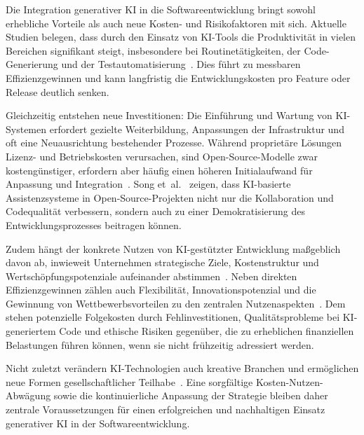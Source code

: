 
Die Integration generativer KI in die Softwareentwicklung bringt sowohl
erhebliche Vorteile als auch neue Kosten- und Risikofaktoren mit sich. Aktuelle
Studien belegen, dass durch den Einsatz von KI-Tools die Produktivität in
vielen Bereichen signifikant steigt, insbesondere bei Routinetätigkeiten, der
Code-Generierung und der Testautomatisierung~\cite{marguerit_augmenting_2025,
    farach_evolving_2025, habibi_open_2025}. Dies führt zu messbaren
Effizienzgewinnen und kann langfristig die Entwicklungskosten pro Feature oder
Release deutlich senken.

Gleichzeitig entstehen neue Investitionen: Die Einführung und Wartung von
KI-Systemen erfordert gezielte Weiterbildung, Anpassungen der Infrastruktur und
oft eine Neuausrichtung bestehender Prozesse. Während proprietäre Lösungen
Lizenz- und Betriebskosten verursachen, sind Open-Source-Modelle zwar
kostengünstiger, erfordern aber häufig einen höheren Initialaufwand für
Anpassung und Integration~\cite{habibi_open_2025}. Song
et~al.~\cite{song_impact_2024} zeigen, dass KI-basierte Assistenzsysteme in
Open-Source-Projekten nicht nur die Kollaboration und Codequalität verbessern,
sondern auch zu einer Demokratisierung des Entwicklungsprozesses beitragen
können.

Zudem hängt der konkrete Nutzen von KI-gestützter Entwicklung maßgeblich davon
ab, inwieweit Unternehmen strategische Ziele, Kostenstruktur und
Wertschöpfungspotenziale aufeinander
abstimmen~\cite{mcnamara_exponential_2025}. Neben direkten Effizienzgewinnen
zählen auch Flexibilität, Innovationspotenzial und die Gewinnung von
Wettbewerbsvorteilen zu den zentralen
Nutzenaspekten~\cite{storey_generative_2025}. Dem stehen potenzielle
Folgekosten durch Fehlinvestitionen, Qualitätsprobleme bei KI-generiertem Code
und ethische Risiken gegenüber, die zu erheblichen finanziellen Belastungen
führen können, wenn sie nicht frühzeitig adressiert werden.

Nicht zuletzt verändern KI-Technologien auch kreative Branchen und ermöglichen
neue Formen gesellschaftlicher Teilhabe~\cite{anantrasirichai_artificial_2025}.
Eine sorgfältige Kosten-Nutzen-Abwägung sowie die kontinuierliche Anpassung der
Strategie bleiben daher zentrale Voraussetzungen für einen erfolgreichen und
nachhaltigen Einsatz generativer KI in der Softwareentwicklung.

